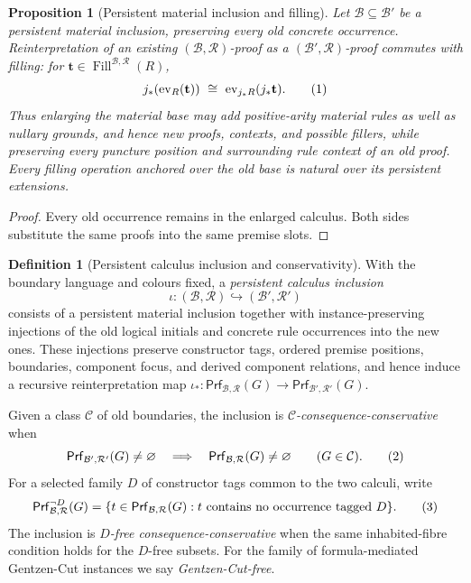 \documentclass[10pt,a4paper]{article}
\theoremstyle{plain}
\newtheorem{proposition}[theorem]{Proposition}
\theoremstyle{definition}
\newtheorem{definition}[theorem]{Definition}
\theoremstyle{remark}
\newcommand{\Base}{\mathcal B}
\newcommand{\Rules}{\mathcal R}
\newcommand{\Fill}{\operatorname{Fill}}
\newcommand{\Prf}{\mathsf{Prf}}
\newcommand{\eqtag}{\refstepcounter{equation}\tag{\theequation}}
\begin{document}
\begin{proposition}[Persistent material inclusion and filling]
\label{prop:base-extension}
Let \(\Base\subseteq\Base'\) be a persistent material inclusion,
preserving every old concrete occurrence.  Reinterpretation of an existing
\((\Base,\Rules)\)-proof as a \((\Base',\Rules)\)-proof commutes with
filling: for \(\mathbf t\in\Fill^{\Base,\Rules}(R)\),
\[
 j_*\!\left(\operatorname{ev}_{R}(\mathbf t)\right)
 \ \cong\
 \operatorname{ev}_{j_*R}(j_*\mathbf t).
\eqtag\label{eq:base-extension}
\]
Thus enlarging the material base may add positive-arity material rules as
well as nullary grounds, and hence new proofs, contexts, and possible
fillers, while preserving every puncture position and surrounding rule
context of an old proof.  Every filling operation anchored over the old
base is natural over its persistent extensions.
\end{proposition}

\begin{proof}
Every old occurrence remains in the enlarged calculus.  Both sides
substitute the same proofs into the same premise slots.
\end{proof}

\begin{definition}[Persistent calculus inclusion and conservativity]
\label{def:base-conservativity}
With the boundary language and colours fixed, a
\emph{persistent calculus inclusion}
\[
  \iota:(\Base,\Rules)\hookrightarrow(\Base',\Rules')
\]
consists of a persistent material inclusion together with
instance-preserving injections of the old logical initials and
concrete rule occurrences into the new ones.  These injections preserve
constructor tags, ordered premise positions, boundaries, component focus,
and derived component relations, and hence induce a recursive
reinterpretation map
\(\iota_*:\Prf_{\Base,\Rules}(G)\to
\Prf_{\Base',\Rules'}(G)\).

Given a class \(\mathcal C\) of old boundaries, the inclusion is
\emph{\(\mathcal C\)-consequence-conservative} when
\[
 \Prf_{\Base',\Rules'}(G)\ne\varnothing
 \quad\Longrightarrow\quad
 \Prf_{\Base,\Rules}(G)\ne\varnothing
 \qquad(G\in\mathcal C).
\eqtag\label{eq:consequence-conservativity}
\]
For a selected family \(D\) of constructor tags common to the two calculi,
write
\[
 \Prf_{\Base,\Rules}^{\neg D}(G)
   =\{t\in\Prf_{\Base,\Rules}(G):
          t\text{ contains no occurrence tagged }D\}.
\eqtag\label{eq:constructor-free-proof-fibre}
\]
The inclusion is \emph{\(D\)-free consequence-conservative} when the same
inhabited-fibre condition holds for the \(D\)-free subsets.  For the family
of formula-mediated Gentzen-Cut instances we say
\emph{Gentzen-Cut-free}.
\end{definition}
\end{document}
